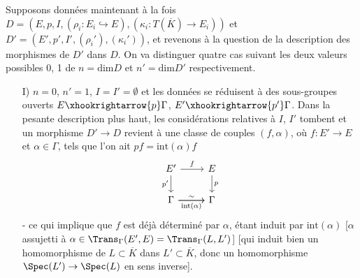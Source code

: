 Supposons données maintenant à la fois $D = (E, p, I, (\rho_i: E_i \hookrightarrow E), (\kappa_i: T(\overline{K}) \to E_i))$ et $D' = (E', p', I', (\rho_i'), (\kappa_i'))$, et revenons à la question de la description des morphismes de $D'$ dans $D$. On va distinguer quatre cas suivant les deux valeurs possibles 0, 1 de $n = \text{dim} D$ et $n' = \text{dim} D'$ respectivement.
\begin{enumerate}
    \item[I)] $n = 0$, $n' = 1$, $I = I' = \emptyset$ et les données se réduisent à des sous-groupes ouverts $E \xhookrightarrow{p} \Gamma$, $E' \xhookrightarrow{p'} \Gamma$. Dans la pesante description plus haut, les considérations relatives à $I$, $I'$ tombent et un morphisme $D' \to D$ revient à une classe de couples $(f, \alpha)$, où $f: E' \to E$ et $\alpha \in \Gamma$, tels que l'on ait $pf = \text{int}(\alpha) f$
    \[\begin{tikzcd}
	{E'} & E \\
	\Gamma & \Gamma
	\arrow["f", from=1-1, to=1-2]
	\arrow["{p'}"', from=1-1, to=2-1]
	\arrow["p", from=1-2, to=2-2]
	\arrow["\sim", from=2-1, to=2-2]
	\arrow["{\text{int}(\alpha)}"', from=2-1, to=2-2]
    \end{tikzcd}\]
    - ce qui implique que $f$ est déjà déterminé par $\alpha$, étant induit par $\text{int}(\alpha)$ [$\alpha$ assujetti à $\alpha \in \Trans_{\Gamma}(E', E) = \Trans_\Gamma (L, L')$] [qui induit bien un homomorphisme de $L \subset  \overline{K}$ dans $L' \subset  \overline{K}$, donc un homomorphisme $\Spec(L') \to \Spec(L)$ en sens inverse].
    

\end{enumerate}
